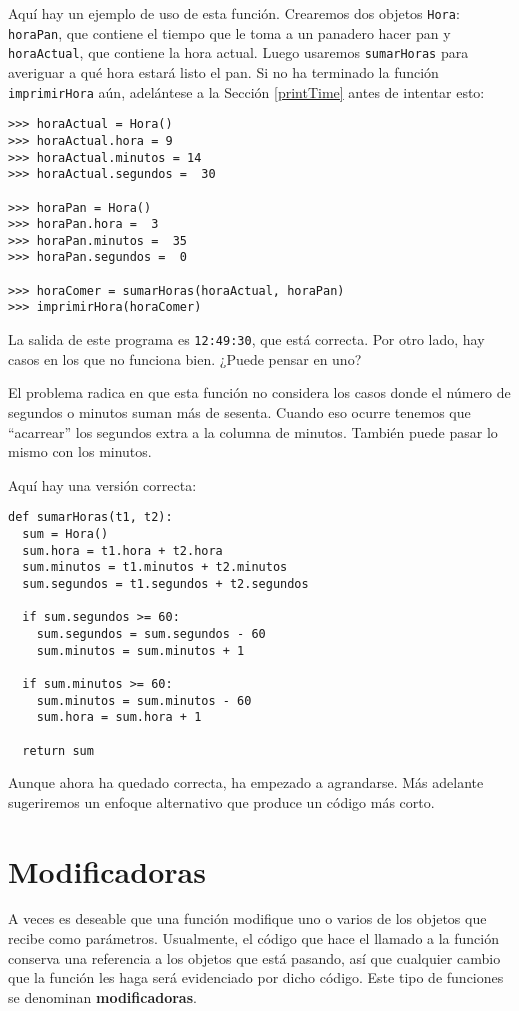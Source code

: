 Aquí hay un ejemplo de uso de esta función. Crearemos dos objetos
\texttt{Hora}: \texttt{horaPan}, que contiene el tiempo que le toma
a un panadero hacer pan y \texttt{horaActual}, que contiene la hora
actual. Luego usaremos \texttt{sumarHoras} para averiguar a qué hora
estará listo el pan. Si no ha terminado la función \texttt{imprimirHora}
aún, adelántese a la Sección \ref{printTime} antes de intentar esto:

\begin{lstlisting}
>>> horaActual = Hora()
>>> horaActual.hora = 9
>>> horaActual.minutos = 14
>>> horaActual.segundos =  30

>>> horaPan = Hora()
>>> horaPan.hora =  3
>>> horaPan.minutos =  35
>>> horaPan.segundos =  0

>>> horaComer = sumarHoras(horaActual, horaPan)
>>> imprimirHora(horaComer)
\end{lstlisting}
 La salida de este programa es \texttt{12:49:30}, que está correcta.
Por otro lado, hay casos en los que no funciona bien. ¿Puede pensar
en uno?

El problema radica en que esta función no considera los casos donde
el número de segundos o minutos suman más de sesenta. Cuando eso ocurre
tenemos que ``acarrear'' los segundos extra a la columna de minutos.
También puede pasar lo mismo con los minutos.

Aquí hay una versión correcta:
\begin{lstlisting}
def sumarHoras(t1, t2):
  sum = Hora()
  sum.hora = t1.hora + t2.hora
  sum.minutos = t1.minutos + t2.minutos
  sum.segundos = t1.segundos + t2.segundos

  if sum.segundos >= 60:
    sum.segundos = sum.segundos - 60
    sum.minutos = sum.minutos + 1

  if sum.minutos >= 60:
    sum.minutos = sum.minutos - 60
    sum.hora = sum.hora + 1

  return sum
\end{lstlisting}

Aunque ahora ha quedado correcta, ha empezado a agrandarse. Más adelante
sugeriremos un enfoque alternativo que produce un código más corto.

\section{Modificadoras}

\label{increment}  

A veces es deseable que una función modifique uno o varios de los
objetos que recibe como parámetros. Usualmente, el código que hace
el llamado a la función conserva una referencia a los objetos que
está pasando, así que cualquier cambio que la función les haga será
evidenciado por dicho código. Este tipo de funciones se denominan
\textbf{modificadoras}.

